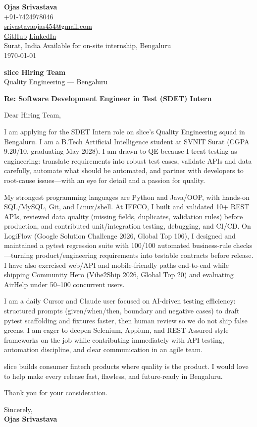 \documentclass[a4paper,11pt]{article}
\begin{document}
\begin{flushright}
\textbf{Ojas Srivastava} \\
+91-7424978046 \\
\href{mailto:srivastavaojas454@gmail.com}{srivastavaojas454@gmail.com} \\
\href{https://github.com/Ojas-Srivastava05}{GitHub} \textbar{}
\href{https://linkedin.com/in/ojas-srivastava05}{LinkedIn} \\
Surat, India \textbar{} Available for on-site internship, Bengaluru \\
\today
\end{flushright}

\vspace{4mm}
\textbf{slice Hiring Team} \\
Quality Engineering --- Bengaluru

\vspace{2mm}
\textbf{Re: Software Development Engineer in Test (SDET) Intern}

Dear Hiring Team,

I am applying for the SDET Intern role on slice's Quality Engineering squad in Bengaluru. I am a B.Tech Artificial Intelligence student at SVNIT Surat (CGPA 9.20/10, graduating May 2028). I am drawn to QE because I treat testing as engineering: translate requirements into robust test cases, validate APIs and data carefully, automate what should be automated, and partner with developers to root-cause issues---with an eye for detail and a passion for quality.

My strongest programming languages are Python and Java/OOP, with hands-on SQL/MySQL, Git, and Linux/shell. At IFFCO, I built and validated 10+ REST APIs, reviewed data quality (missing fields, duplicates, validation rules) before production, and contributed unit/integration testing, debugging, and CI/CD. On LogiFlow (Google Solution Challenge 2026, Global Top 106), I designed and maintained a pytest regression suite with 100/100 automated business-rule checks---turning product/engineering requirements into testable contracts before release. I have also exercised web/API and mobile-friendly paths end-to-end while shipping Community Hero (Vibe2Ship 2026, Global Top 20) and evaluating AirHelp under 50--100 concurrent users.

I am a daily Cursor and Claude user focused on AI-driven testing efficiency: structured prompts (given/when/then, boundary and negative cases) to draft pytest scaffolding and fixtures faster, then human review so we do not ship false greens. I am eager to deepen Selenium, Appium, and REST-Assured-style frameworks on the job while contributing immediately with API testing, automation discipline, and clear communication in an agile team.

slice builds consumer fintech products where quality is the product. I would love to help make every release fast, flawless, and future-ready in Bengaluru.

Thank you for your consideration.

Sincerely, \\
\vspace{8mm}
\textbf{Ojas Srivastava}
\end{document}
